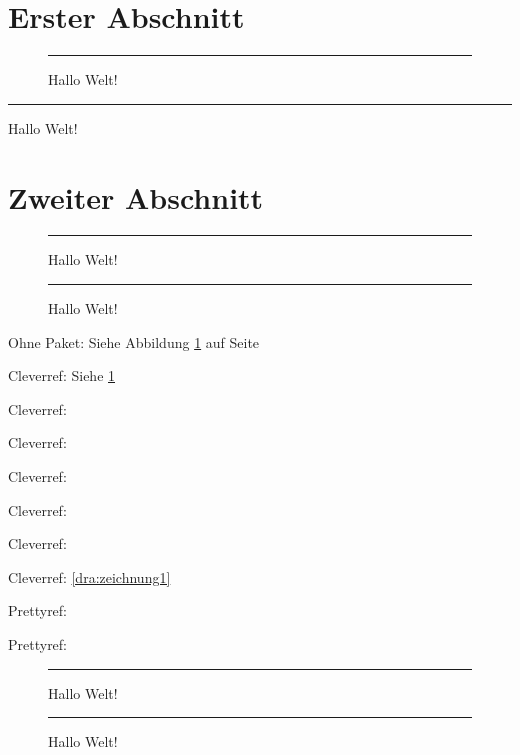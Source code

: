\documentclass[ngerman]{scrartcl}
\begin{document}
\label{aaa}

\section{Erster Abschnitt}\label{sec:erst}
 
\blindtext[3]
 
\begin{figure}[h]%
\rule{\columnwidth}{5cm}
\caption{Hallo Welt!}%
\label{fig:test1}%
\end{figure}
 
 
\begin{table}[h]%
\rule{\columnwidth}{5cm}
\caption{Hallo Welt!}%
\label{dra:zeichnung1}%
\end{table}
 
 
\blindtext[1]
 
\section{Zweiter Abschnitt}
 
\blindtext[1]
 
\begin{figure}[h]%
\rule{\columnwidth}{5cm}
\caption{Hallo Welt!}%
\label{fig:test2}%
\end{figure}
 
\blindtext[1]\vspace*{1em}
 
\begin{figure}%
\rule{\columnwidth}{5cm}
\caption{Hallo Welt!}%
\label{fig:hier}%
\end{figure}
 
\begin{compactitem}
	\item Ohne Paket: Siehe Abbildung \ref{fig:test1} auf Seite \pageref{fig:test1} \vspace*{1em}
	\item Cleverref: Siehe \cref{fig:test1}
	\item Cleverref:  
	\item Cleverref:  
	\item Cleverref: 
	\item Cleverref:  %
	\item Cleverref:  
	\item Cleverref: \cref{dra:zeichnung1}\vspace*{1em}
	\item Prettyref: 
	\item Prettyref: 
	
\end{compactitem}


 
\clearpage 
 
\begin{figure}%
\rule{\columnwidth}{5cm}
\caption{Hallo Welt!}%
\label{fig:test3}%
\end{figure}
 
\clearpage 
 
\begin{figure}%
\rule{\columnwidth}{5cm}
\caption{Hallo Welt!}%
\label{fig:test4}%
\end{figure}
 
\end{document}
